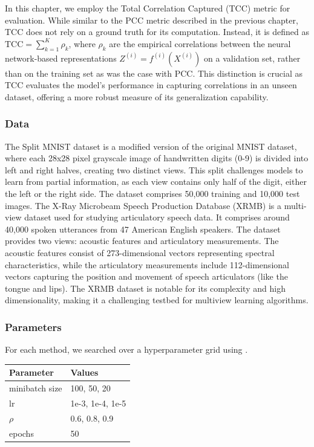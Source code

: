 In this chapter, we employ the Total Correlation Captured (TCC) metric for evaluation.
While similar to the PCC metric described in the previous chapter, TCC does not rely on a ground truth for its computation.
Instead, it is defined as \( \text{TCC} = \sum_{k=1}^K \rho_k \), where $\rho_k$ are the empirical correlations between the neural network-based representations $Z^{(i)} = f^{(i)}(X^{(i)})$ on a validation set, rather than on the training set as was the case with PCC. This distinction is crucial as TCC evaluates the model's performance in capturing correlations in an unseen dataset, offering a more robust measure of its generalization capability.
\subsubsection{Data}
The Split MNIST dataset is a modified version of the original MNIST dataset, where each 28x28 pixel grayscale image of handwritten digits (0-9) is divided into left and right halves, creating two distinct views.
This split challenges models to learn from partial information, as each view contains only half of the digit, either the left or the right side.
The dataset comprises 50,000 training and 10,000 test images.
The X-Ray Microbeam Speech Production Database (XRMB) is a multi-view dataset used for studying articulatory speech data.
It comprises around 40,000 spoken utterances from 47 American English speakers.
The dataset provides two views: acoustic features and articulatory measurements.
The acoustic features consist of 273-dimensional vectors representing spectral characteristics, while the articulatory measurements include 112-dimensional vectors capturing the position and movement of speech articulators (like the tongue and lips).
The XRMB dataset is notable for its complexity and high dimensionality, making it a challenging testbed for multiview learning algorithms.

\subsubsection{Parameters} For each method, we searched over a hyperparameter grid using \citet{wandb}.

\begin{table}[h!]
    \centering
    \begin{tabular}{|l|l|}
        \hline Parameter           & Values           \\
        \hline minibatch size      & 100, 50, 20      \\
        \hline lr                  & 1e-3, 1e-4, 1e-5 \\
        \hline $\rho$\footnotemark & 0.6, 0.8, 0.9    \\
        \hline epochs              & 50               \\
        \hline
    \end{tabular}
    \label{tab:hyperparams}
\end{table}

